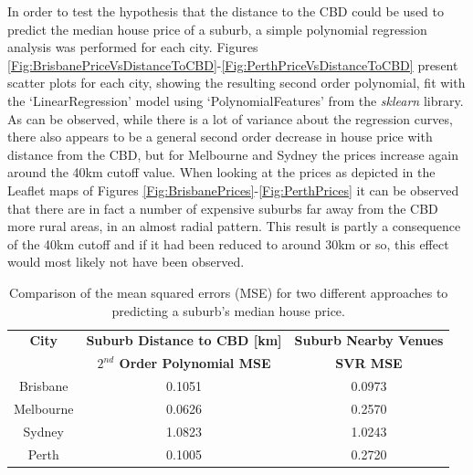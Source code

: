 \documentclass[12pt]{article}
\begin{document}
    In order to test the hypothesis that the distance to the CBD could be used to predict the median house price of a suburb, a simple polynomial regression analysis was performed for each city. Figures \ref{Fig:BrisbanePriceVsDistanceToCBD}-\ref{Fig:PerthPriceVsDistanceToCBD} present scatter plots for each city, showing the resulting second order polynomial, fit with the `LinearRegression' model using `PolynomialFeatures' from the \emph{sklearn} library. As can be observed, while there is a lot of variance about the regression curves, there also appears to be a general second order decrease in house price with distance from the CBD, but for Melbourne and Sydney the prices increase again around the 40km cutoff value. When looking at the prices as depicted in the Leaflet maps of Figures \ref{Fig:BrisbanePrices}-\ref{Fig:PerthPrices} it can be observed that there are in fact a number of expensive suburbs far away from the CBD more rural areas, in an almost radial pattern. This result is partly a consequence of the 40km cutoff and if it had been reduced to around 30km or so, this effect would most likely not have been observed.

    \begin{table}[h!]
        \centering
        \begin{tabular}{|c|c|c|}
            \hline
            \textbf{City}   & \textbf{Suburb Distance to CBD [km]}   & \textbf{Suburb Nearby Venues} \\
                            & \textbf{$2^{nd}$ Order Polynomial MSE} & \textbf{SVR MSE} \\
            \hline
            Brisbane    & 0.1051                         & 0.0973 \\
            Melbourne   & 0.0626                         & 0.2570 \\
            Sydney      & 1.0823                         & 1.0243 \\
            Perth       & 0.1005                         & 0.2720 \\

            \hline
        \end{tabular}
        \label{Tab:CityMSEs}
        \caption{Comparison of the mean squared errors (MSE) for two different approaches to predicting a suburb's median house price.}
    \end{table}
\end{document}
